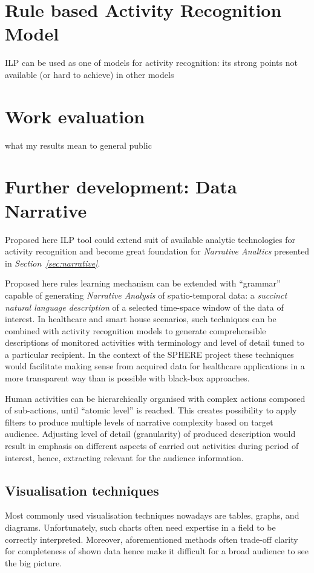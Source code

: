 \documentclass[12pt, a4paper, pdflatex, leqno, twoside, openright]{report}
\begin{document}
  \section{Rule based Activity Recognition Model}
ILP can be used as one of models for activity recognition: its strong points not available (or hard to achieve) in other models

  \section{Work evaluation}
what my results mean to general public

  \section{Further development: Data Narrative\label{sec:narrative}}

Proposed here ILP tool could extend suit of available analytic technologies for activity recognition and become great foundation for \emph{Narrative Analtics} presented in \emph{Section~\ref{sec:narrative}}.

Proposed here rules learning mechanism can be extended with ``grammar'' capable of generating \emph{Narrative Analysis} of spatio-temporal data: a \emph{succinct natural language description} of a selected time-space window of the data of interest. In healthcare and smart house scenarios, such techniques can be combined with activity recognition models to generate comprehensible descriptions of monitored activities with terminology and level of detail tuned to a particular recipient. In the context of the SPHERE project these techniques would facilitate making sense from acquired data for healthcare applications in a more transparent way than is possible with black-box approaches.

Human activities can be hierarchically organised with complex actions composed of sub-actions, until ``atomic level'' is reached. This creates possibility to apply filters to produce multiple levels of narrative complexity based on target audience. Adjusting level of detail (granularity) of produced description would result in emphasis on different aspects of carried out activities during period of interest, hence, extracting relevant for the audience information.\\

    \subsection{Visualisation techniques}
Most commonly used visualisation techniques nowadays are tables, graphs, and diagrams. Unfortunately, such charts often need expertise in a field to be correctly interpreted. Moreover, aforementioned methods often trade-off clarity for completeness of shown data hence make it difficult for a broad audience to see the big picture.\\
\end{document}
